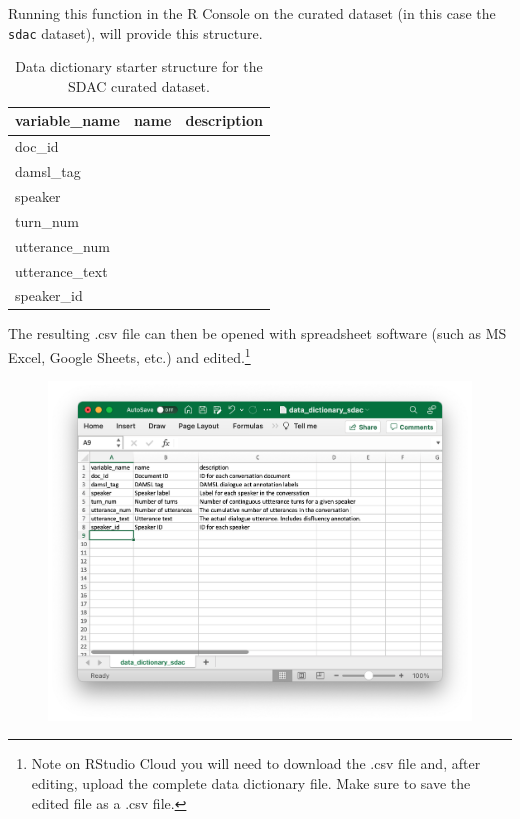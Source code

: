 \documentclass[
  letterpaper,
]{scrbook}
\begin{document}
Running this function in the R Console on the curated dataset (in this
case the \texttt{sdac} dataset), will provide this structure.

\hypertarget{tbl-cd-documentation-dic-starter-structure}{}
\begin{table}
\caption{\label{tbl-cd-documentation-dic-starter-structure}Data dictionary starter structure for the SDAC curated dataset. }\tabularnewline

\centering
\begin{tabular}{lll}
\toprule
variable\_name & name & description\\
\midrule
doc\_id &  & \\
damsl\_tag &  & \\
speaker &  & \\
turn\_num &  & \\
utterance\_num &  & \\
\addlinespace
utterance\_text &  & \\
speaker\_id &  & \\
\bottomrule
\end{tabular}
\end{table}

The resulting .csv file can then be opened with spreadsheet software
(such as MS Excel, Google Sheets, etc.) and edited.\footnote{Note on
  RStudio Cloud you will need to download the .csv file and, after
  editing, upload the complete data dictionary file. Make sure to save
  the edited file as a .csv file.}

\begin{figure}[h]

{\centering \includegraphics[width=5.31in,height=\textheight]{./figures/curate-datasets/cd-data-dictionary.png}

}

\end{figure}
\end{document}
